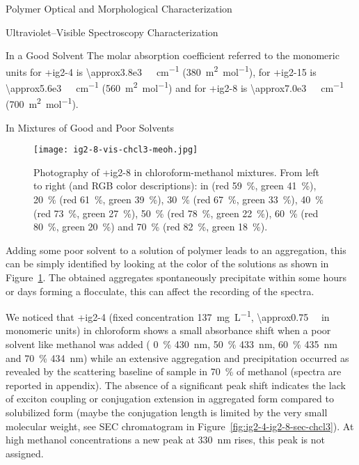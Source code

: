 \begin{section}{Polymer Optical and Morphological Characterization}
\begin{subsection}{Ultraviolet--Visible Spectroscopy Characterization}
\begin{subsubsection}{In a Good Solvent}
\label{epsilon}
The molar absorption coefficient referred to the monomeric units for \cmpd+{ig2-4} is \SI{\approx3.8e3}{\per\Molar\per\cm} (\SI{380}{\square\meter\per\mole}), for \cmpd+{ig2-15} is \SI{\approx5.6e3}{\per\Molar\per\cm} (\SI{560}{\square\meter\per\mole}) and for \cmpd+{ig2-8} is \SI{\approx7.0e3}{\per\Molar\per\cm} (\SI{700}{\square\meter\per\mole}).

\end{subsubsection}
\begin{subsubsection}{In Mixtures of Good and Poor Solvents}

\begin{figure}[tbp]%
\centering
\texttt{[image: ig2-8-vis-chcl3-meoh.jpg]}
\caption[Photography of \cmpd+{ig2-8} in chloro\-form-methanol mixtures.]{Photography of \cmpd+{ig2-8} in chloro\-form-methanol mixtures. From left to right (and RGB color descriptions): in  (red 59~\%, green 41~\%),  20~\% (red 61~\%, green 39~\%),  30~\% (red 67~\%, green 33~\%),  40~\% (red 73~\%, green 27~\%),  50~\% (red 78~\%, green 22~\%),  60~\% (red 80~\%, green 20~\%) and  70~\% (red 82~\%, green 18~\%).}
\label{fig:ig2-8-vis-chcl3-meoh}
\end{figure}

Adding some poor solvent to a solution of polymer leads to an aggregation, this can be simply identified by looking at the color of the solutions as shown in Figure~\ref{fig:ig2-8-vis-chcl3-meoh}. 
The obtained aggregates spontaneously precipitate within some hours or days forming a flocculate, this can affect the recording of the spectra.

We noticed that \cmpd+{ig2-4} (fixed concentration \SI{137}{\mg\per\liter}, \SI{\approx0.75}{\milli\Molar} in monomeric units) in chloroform shows a small absorbance shift when a poor solvent like methanol was added ( 0~\% \SI{430}{\nm},  50~\% \SI{433}{\nm},  60~\% \SI{435}{\nm} and  70~\% \SI{434}{\nm}) while an extensive aggregation and precipitation occurred as revealed by the scattering baseline of sample in 70~\% of methanol (spectra are reported in appendix). 
The absence of a significant peak shift indicates the lack of exciton coupling or conjugation extension in aggregated form compared to solubilized form (maybe the conjugation length is limited by the very small molecular weight, see \gls{SEC} chromatogram in Figure~\ref{fig:ig2-4-ig2-8-sec-chcl3}). At high methanol concentrations a new peak at \SI{330}{\nm} rises, this peak is not assigned. 


\end{subsubsection}
\end{subsection}
\end{section}
